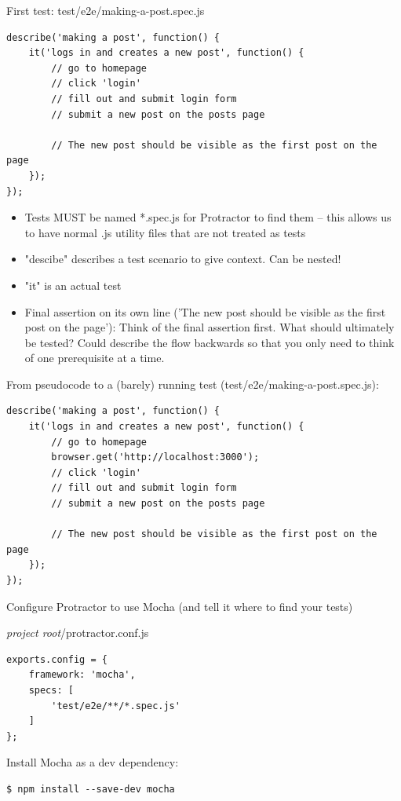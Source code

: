 \documentclass[british]{article}
\begin{document}
First test: test/e2e/making-a-post.spec.js
\begin{lstlisting}
describe('making a post', function() {
    it('logs in and creates a new post', function() {
        // go to homepage
        // click 'login'
        // fill out and submit login form
        // submit a new post on the posts page
        
        // The new post should be visible as the first post on the page
    });
});
\end{lstlisting}

\begin{itemize}
  \item Tests MUST be named *.spec.js for Protractor to find them -- this allows us to have normal .js utility files that are not treated as tests
  \item "descibe" describes a test scenario to give context. Can be nested!
  \item "it" is an actual test
  \item Final assertion on its own line ('The new post should be visible as the first post on the page'): Think of the final assertion first. What should ultimately be tested? Could describe the flow backwards so that you only need to think of one prerequisite at a time.
\end{itemize}

From pseudocode to a (barely) running test (test/e2e/making-a-post.spec.js):
\begin{lstlisting}
describe('making a post', function() {
    it('logs in and creates a new post', function() {
        // go to homepage
        browser.get('http://localhost:3000');
        // click 'login'
        // fill out and submit login form
        // submit a new post on the posts page
        
        // The new post should be visible as the first post on the page
    });
});
\end{lstlisting}

Configure Protractor to use Mocha (and tell it where to find your tests)

\textit{project root}/protractor.conf.js
\begin{lstlisting}
exports.config = {
    framework: 'mocha',
    specs: [
        'test/e2e/**/*.spec.js'
    ]
};
\end{lstlisting}

Install Mocha as a dev dependency:

\begin{lstlisting}
$ npm install --save-dev mocha
\end{lstlisting}
\end{document}
